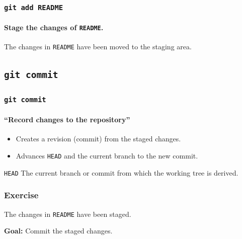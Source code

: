 \documentclass{beamer}
\newcommand\gitcmd[1]{\texttt{git #1}}
\newcommand\gHEAD{\texttt{HEAD}}
\newcommand\goal[1]{\textbf{Goal:} #1}
\begin{document}
\begin{frame}
  \frametitle{\gitcmd{add README}}
  \framesubtitle{Stage the changes of \texttt{README}.}
  \begin{figure}
    \centering
  \end{figure}
  The changes in \texttt{README} have been moved to the staging area.
\end{frame}

\subsection{\gitcmd{commit}}

\begin{frame}
  \frametitle{\gitcmd{commit}}
  \framesubtitle{``Record changes to the repository''}
  \begin{itemize}
    \item Creates a revision (commit) from the staged changes.
    \item Advances \gHEAD{} and the current branch to the new commit.
  \end{itemize}
  \vfill
  \begin{block}{\gHEAD{}}
    The current branch or commit from which the working tree is derived.
  \end{block}
\end{frame}

\begin{frame}
  \frametitle{Exercise}
  The changes in \texttt{README} have been staged.

  \goal{Commit the staged changes.}

  \begin{figure}
    \centering
  \end{figure}
\end{frame}
\end{document}
